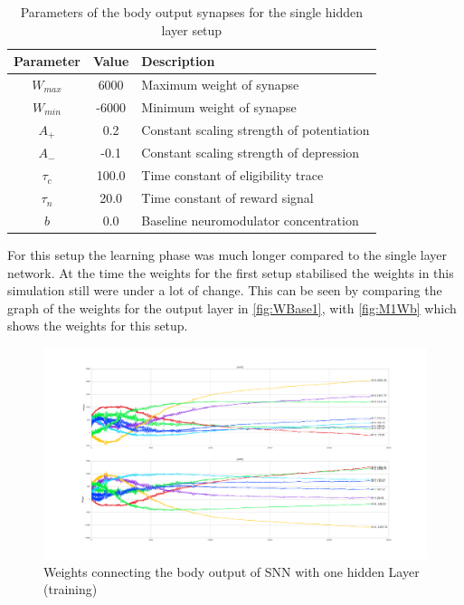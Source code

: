   \begin{table}[htpb]
  \centering
  \caption[Parameters Single Hidden Layer]{Parameters of the body output synapses for the single hidden layer setup} \label{tab:M1SynOb}
    \begin{tabular}{|c| c |l|}
        \toprule
        Parameter  & Value & Description \\
        \midrule
        $W_{max}$ & 6000   & Maximum weight of synapse\\   
        $W_{min}$ & -6000  & Minimum weight of synapse\\   
        $A_{+}$   & 0.2    & Constant scaling strength of potentiation\\   
        $A_{-}$   & -0.1   & Constant scaling strength of depression \\   
        $\tau_c$  & 100.0   & Time constant of eligibility trace \\  
        $\tau_n$  & 20.0   & Time constant of reward signal  \\   
        $b$       & 0.0    & Baseline neuromodulator concentration \\    
        \bottomrule
    \end{tabular}
  \end{table}
For this setup the learning phase was much longer compared to the single layer network. At the time the weights for the first setup stabilised the weights in this simulation still were under a lot of change. This can be seen by comparing the graph of the weights for the output layer in \autoref{fig:WBase1}, with \autoref{fig:M1Wb} which shows the weights for this setup.
\begin{figure}[htpb]
  \centering
  \includegraphics[width=\textwidth]{figures/plots/M1Wb}
  \caption{ Weights connecting the body output of SNN with one hidden Layer (training)  }
  \label{fig:M1Wb}
\end{figure}
